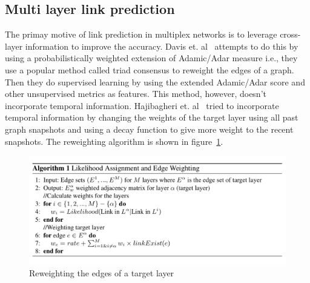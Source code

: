 



\subsection{Multi layer link prediction}
\label{sec:mlp}

The primay motive of link prediction in multiplex networks is to leverage
cross-layer information to improve the accuracy. Davis et.
al~\cite{davis2013supervised} attempts to do this by using a probabilistically
weighted  extension of Adamic/Adar measure i.e., they use a popular method
called triad consensus to reweight the  edges of a graph. Then they do
supervised  learning by using the extended Adamic/Adar score and other
unsupervised metrics as features. This method, however, doesn't incorporate
temporal information. Hajibagheri et. al~\cite{hajibagheri2016holistic} tried
to incorporate  temporal information by changing the weights of the target
layer using all past graph snapshots and using a decay function to give more weight
to the recent snapshots. The reweighting algorithm is shown in
figure~\ref{fig:algo1}.

\begin{figure}[t]
{
\setlength{\belowcaptionskip}{-15pt}
\includegraphics[width=\linewidth]{pics/algo1.png}  
\caption{Reweighting the edges of a target layer}
\label{fig:algo1} 
}
\end{figure}


